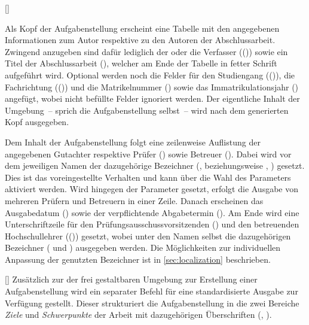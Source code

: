 \begin{Entity*}{}
\begin{Declaration}{[]}
\begin{Declaration}{}
\begin{Declaration}[v2.05]{}
Als Kopf der Aufgabenstellung erscheint eine Tabelle mit den angegebenen 
Informationen zum Autor respektive zu den Autoren der Abschlussarbeit. Zwingend 
anzugeben sind dafür lediglich der oder die Verfasser (())
sowie ein Titel der Abschlussarbeit (), welcher am Ende der 
Tabelle in fetter Schrift aufgeführt wird. Optional werden noch die Felder für 
den Studiengang (()), die Fachrichtung (()) und 
die Matrikelnummer () sowie das Immatrikulationsjahr 
() angefügt, wobei nicht befüllte Felder ignoriert 
werden. Der eigentliche Inhalt der Umgebung~-- sprich die Aufgabenstellung 
selbst~-- wird nach dem generierten Kopf ausgegeben.

Dem Inhalt der Aufgabenstellung folgt eine zeilenweise Auflistung der 
angegebenen Gutachter respektive Prüfer () sowie Betreuer 
(). Dabei wird vor dem jeweiligen Namen der dazugehörige 
Bezeichner (,  beziehungsweise 
, ) gesetzt. 
%
Dies ist das voreingestellte Verhalten und kann über die Wahl des Parameters
 aktiviert werden. Wird hingegen der  
Parameter  gesetzt, erfolgt die Ausgabe 
von mehreren Prüfern und Betreuern in einer Zeile. Danach erscheinen das 
Ausgabedatum () sowie der verpflichtende Abgabetermin 
(). Am Ende wird eine Unterschriftzeile für den 
Prüfungsausschussvorsitzenden () und den betreuenden 
Hochschullehrer (()) gesetzt, wobei unter den Namen selbst die 
dazugehörigen Bezeichner ( und ) 
ausgegeben werden. Die Möglichkeiten zur individuellen Anpassung der 
genutzten Bezeichner ist in \autoref{sec:localization} beschrieben. 
\end{Declaration}
\end{Declaration}
\end{Declaration}

\begin{Declaration}{[\OList{}]}
\printdeclarationlist%
%
Zusätzlich zur der frei gestaltbaren Umgebung  zur Erstellung
einer Aufgabenstellung wird ein separater Befehl für eine standardisierte 
Ausgabe zur Verfügung gestellt. Dieser strukturiert die Aufgabenstellung in die 
zwei Bereiche \emph{Ziele} und \emph{Schwerpunkte} der Arbeit mit dazugehörigen 
Überschriften (, ).


\end{Declaration}
\end{Entity*}
